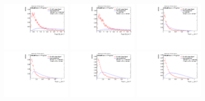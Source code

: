 \begin{figure}[H]
\includegraphics[width=0.3\textwidth]{sascha_input/Appendix/Distributions/w/distributions/beta17/h_normal_tj_D2_17_bin5.pdf} \hspace{1mm}
\includegraphics[width=0.3\textwidth]{sascha_input/Appendix/Distributions/w/distributions/beta17/h_normal_tj_D2_17_bin6.pdf}
\bigskip
\includegraphics[width=0.3\textwidth]{sascha_input/Appendix/Distributions/w/distributions/beta17/h_normal_tj_nSub21_17_bin1.pdf} \hspace{1mm}
\includegraphics[width=0.3\textwidth]{sascha_input/Appendix/Distributions/w/distributions/beta17/h_normal_tj_nSub21_17_bin2.pdf} \hspace{1mm}
\includegraphics[width=0.3\textwidth]{sascha_input/Appendix/Distributions/w/distributions/beta17/h_normal_tj_nSub21_17_bin3.pdf} 
\bigskip
\includegraphics[width=0.3\textwidth]{sascha_input/Appendix/Distributions/w/distributions/beta17/h_normal_tj_nSub21_17_bin4.pdf} \hspace{6mm}

\end{figure}
